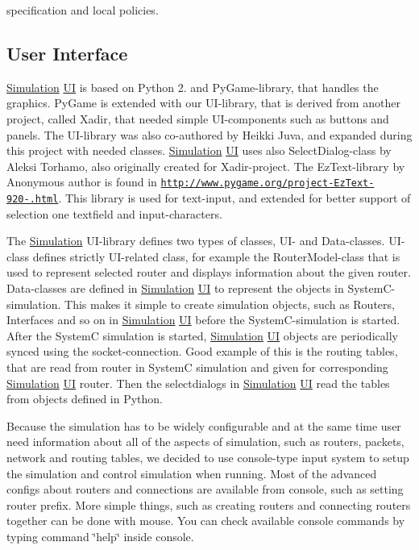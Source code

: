 specification and local policies. \hypertarget{index_sub_UI}{}\subsection{User Interface}\label{index_sub_UI}
\hyperlink{classSimulation}{Simulation} \hyperlink{namespaceUI}{U\-I} is based on Python 2. and Py\-Game-\/library, that handles the graphics. Py\-Game is extended with our U\-I-\/library, that is derived from another project, called Xadir, that needed simple U\-I-\/components such as buttons and panels. The U\-I-\/library was also co-\/authored by Heikki Juva, and expanded during this project with needed classes. \hyperlink{classSimulation}{Simulation} \hyperlink{namespaceUI}{U\-I} uses also Select\-Dialog-\/class by Aleksi Torhamo, also originally created for Xadir-\/project. The Ez\-Text-\/library by Anonymous author is found in \href{http://www.pygame.org/project-EzText-920-.html}{\tt http\-://www.\-pygame.\-org/project-\/\-Ez\-Text-\/920-\/.\-html}. This library is used for text-\/input, and extended for better support of selection one textfield and input-\/characters.

The \hyperlink{classSimulation}{Simulation} U\-I-\/library defines two types of classes, U\-I-\/ and Data-\/classes. U\-I-\/class defines strictly U\-I-\/related class, for example the Router\-Model-\/class that is used to represent selected router and displays information about the given router. Data-\/classes are defined in \hyperlink{classSimulation}{Simulation} \hyperlink{namespaceUI}{U\-I} to represent the objects in System\-C-\/simulation. This makes it simple to create simulation objects, such as Routers, Interfaces and so on in \hyperlink{classSimulation}{Simulation} \hyperlink{namespaceUI}{U\-I} before the System\-C-\/simulation is started. After the System\-C simulation is started, \hyperlink{classSimulation}{Simulation} \hyperlink{namespaceUI}{U\-I} objects are periodically synced using the socket-\/connection. Good example of this is the routing tables, that are read from router in System\-C simulation and given for corresponding \hyperlink{classSimulation}{Simulation} \hyperlink{namespaceUI}{U\-I} router. Then the selectdialogs in \hyperlink{classSimulation}{Simulation} \hyperlink{namespaceUI}{U\-I} read the tables from objects defined in Python.

Because the simulation has to be widely configurable and at the same time user need information about all of the aspects of simulation, such as routers, packets, network and routing tables, we decided to use console-\/type input system to setup the simulation and control simulation when running. Most of the advanced configs about routers and connections are available from console, such as setting router prefix. More simple things, such as creating routers and connecting routers together can be done with mouse. You can check available console commands by typing command \char`\"{}help\char`\"{} inside console.

